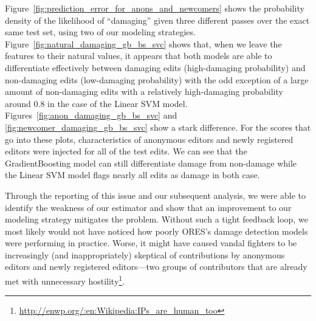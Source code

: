 Figure~\ref{fig:prediction_error_for_anons_and_newcomers} shows the probability density of the likelihood of ``damaging'' given three different passes over the exact same test set, using two of our modeling strategies.  Figure~\ref{fig:natural_damaging_gb_bs_svc} shows that, when we leave the features to their natural values, it appears that both models are able to differentiate effectively between damaging edits (high-damaging probability) and non-damaging edits (low-damaging probability) with the odd exception of a large amount of non-damaging edits with a relatively high-damaging probability around 0.8 in the case of the Linear SVM model.  Figures~\ref{fig:anon_damaging_gb_bs_svc} and \ref{fig:newcomer_damaging_gb_bs_svc} show a stark difference.  For the scores that go into these plots, characteristics of anonymous editors and newly registered editors were injected for all of the test edits.  We can see that the GradientBoosting model can still differentiate damage from non-damage while the Linear SVM model flags nearly all edits as damage in both case.

Through the reporting of this issue and our subsequent analysis, we were able to identify the weakness of our estimator and show that an improvement to our modeling strategy mitigates the problem.  Without such a tight feedback loop, we most likely would not have noticed how poorly ORES's damage detection models were performing in practice.  Worse, it might have caused vandal fighters to be increasingly (and inappropriately) skeptical of contributions by anonymous editors and newly registered editors---two groups of contributors that are already met with unnecessary hostility\footnote{\url{http://enwp.org/:en:Wikipedia:IPs_are_human_too}}\cite{halfaker2013rise}.
